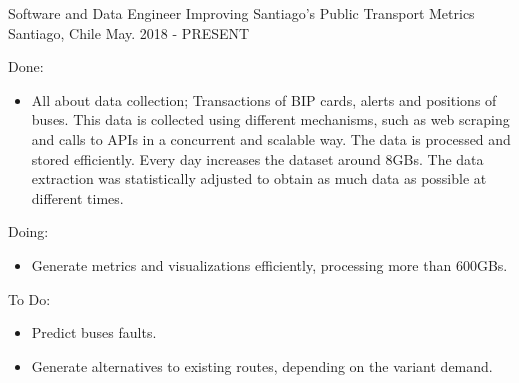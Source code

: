 

\begin{cventries}

  \cventry
    {Software and Data Engineer} %
    {Improving Santiago's Public Transport Metrics} %
    {Santiago, Chile} %
    {May. 2018 - PRESENT} %
    {
      \begin{cvitems} %
        \item {Done:}
      	\begin{itemize}
      		\item {All about data collection; Transactions of BIP cards, alerts and positions of buses. This data is collected using different mechanisms, such as web scraping and calls to APIs in a concurrent and scalable way. The data is processed and stored efficiently. Every day increases the dataset around 8GBs. The data extraction was statistically adjusted to obtain as much data as possible at different times.}
      	\end{itemize}
      	\item {Doing:}
      	\begin{itemize}
        	\item {Generate metrics and visualizations efficiently, processing more than 600GBs.}
      	\end{itemize}
      	\item {To Do:}
      	\begin{itemize}
        	\item {Predict buses faults.}
	        \item {Generate alternatives to existing routes, depending on the variant demand.}
      	\end{itemize}
      \end{cvitems}
    }
  

\end{cventries}
